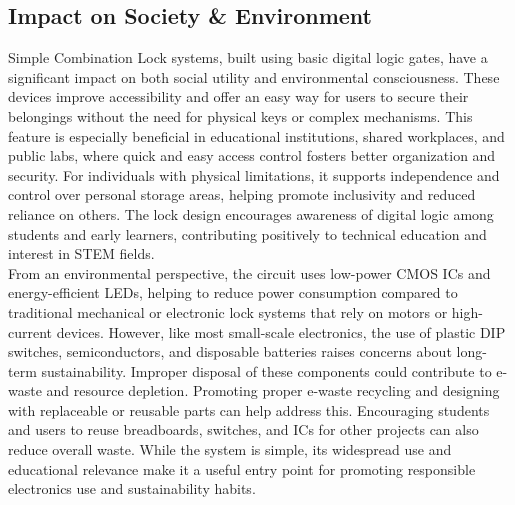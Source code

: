 \subsection{Impact on Society \& Environment}
Simple Combination Lock systems, built using basic digital logic gates, have a significant impact on both social utility and environmental consciousness. These devices improve accessibility and offer an easy way for users to secure their belongings without the need for physical keys or complex mechanisms. This feature is especially beneficial in educational institutions, shared workplaces, and public labs, where quick and easy access control fosters better organization and security. For individuals with physical limitations, it supports independence and control over personal storage areas, helping promote inclusivity and reduced reliance on others. The lock design encourages awareness of digital logic among students and early learners, contributing positively to technical education and interest in STEM fields.\\
From an environmental perspective, the circuit uses low-power CMOS ICs and energy-efficient LEDs, helping to reduce power consumption compared to traditional mechanical or electronic lock systems that rely on motors or high-current devices. However, like most small-scale electronics, the use of plastic DIP switches, semiconductors, and disposable batteries raises concerns about long-term sustainability. Improper disposal of these components could contribute to e-waste and resource depletion. Promoting proper e-waste recycling and designing with replaceable or reusable parts can help address this. Encouraging students and users to reuse breadboards, switches, and ICs for other projects can also reduce overall waste. While the system is simple, its widespread use and educational relevance make it a useful entry point for promoting responsible electronics use and sustainability habits.\cite{4.1.2}

